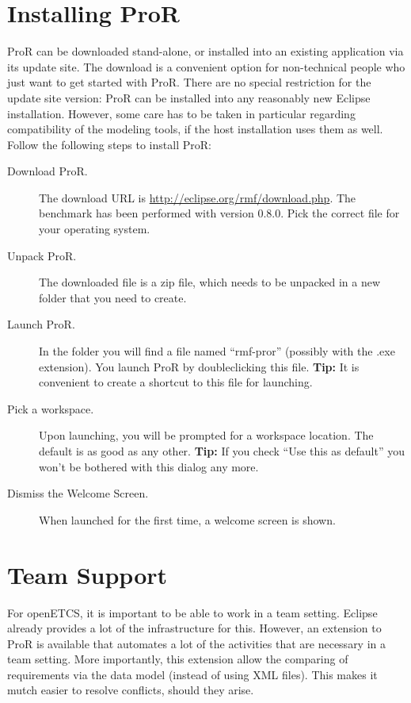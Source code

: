 \documentclass{template/openetcs_report}
\begin{document}
\section{Installing ProR}

ProR can be downloaded stand-alone, or installed into an existing application via its update site.  The download is a convenient option for non-technical people who just want to get started with ProR.  There are no special restriction for the update site version: ProR can be installed into any reasonably new Eclipse installation.  However, some care has to be taken in particular regarding compatibility of the modeling tools, if the host installation uses them as well.  Follow the following steps to install ProR:

\begin{description}

\item[Download ProR.]  The download URL is \url{http://eclipse.org/rmf/download.php}.  The benchmark has been performed with version 0.8.0.  Pick the correct file for your operating system.

\item[Unpack ProR.]  The downloaded file is a zip file, which needs to be unpacked in a new folder that you need to create.

\item[Launch ProR.] In the folder you will find a file named ``rmf-pror'' (possibly with the .exe extension).  You launch ProR by doubleclicking this file. \textbf{Tip:} It is convenient to create a shortcut to this file for launching.

\item[Pick a workspace.] Upon launching, you will be prompted for a workspace location.  The default is as good as any other. \textbf{Tip:} If you check ``Use this as default'' you won't be bothered with this dialog any more.

\item[Dismiss the Welcome Screen.] When launched for the first time, a welcome screen is shown.

\end{description}

\section{Team Support}

For openETCS, it is important to be able to work in a team setting.  Eclipse already provides a lot of the infrastructure for this.  However, an extension to ProR is available that automates a lot of the activities that are necessary in a team setting.  More importantly, this extension allow the comparing of requirements via the data model (instead of using XML files).  This makes it mutch easier to resolve conflicts, should they arise.
\end{document}
